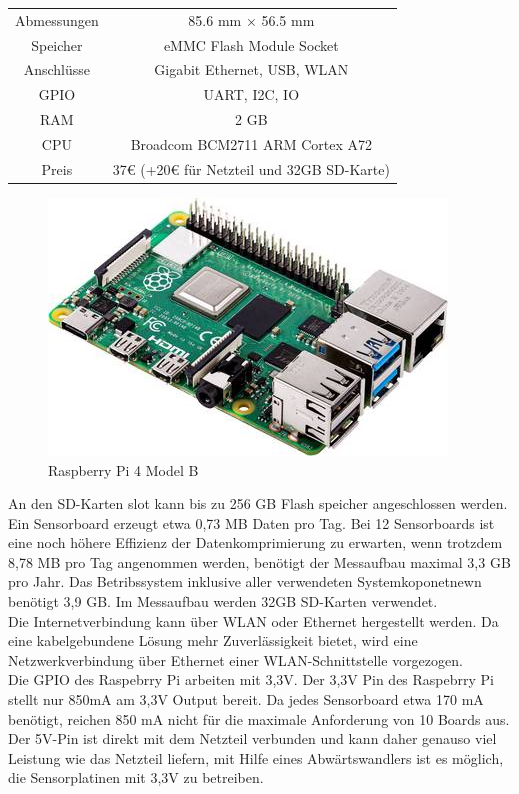 \begin{center}
\begin{tabular}{ c c }
 Abmessungen & 85.6 mm × 56.5 mm \\ 
 Speicher & eMMC Flash Module Socket \\  
 Anschlüsse & Gigabit Ethernet, USB, WLAN \\  
 GPIO & UART, I2C, IO \\  
 RAM & 2 GB \\  
 CPU & Broadcom BCM2711 ARM Cortex A72 \\  
 Preis & 37€ (+20€ für Netzteil und 32GB SD-Karte)  
\end{tabular}
\end{center}
\begin{figure}[H]
  \centering
 \includegraphics[width=0.5\linewidth]{img/Raspberry-Pi-4-Model-B}
	\caption{Raspberry Pi 4 Model B \cite{raspberrypi_fundation}}
  \label{fig:Raspberry_Pi_4_Model_B}
\end{figure}
An den SD-Karten slot kann bis zu 256 GB Flash speicher angeschlossen werden.
Ein Sensorboard erzeugt etwa 0,73 MB Daten pro Tag.
Bei 12 Sensorboards ist eine noch höhere Effizienz der Datenkomprimierung zu erwarten, wenn trotzdem 8,78 MB pro Tag angenommen werden, benötigt der Messaufbau maximal 3,3 GB pro Jahr.
Das Betribssystem inklusive aller verwendeten Systemkoponetnewn benötigt 3,9 GB.
Im Messaufbau werden 32GB SD-Karten verwendet.\\
Die Internetverbindung kann über WLAN oder Ethernet hergestellt werden.
Da eine kabelgebundene Lösung mehr Zuverlässigkeit bietet, wird eine Netzwerkverbindung über Ethernet einer WLAN-Schnittstelle vorgezogen.\\
Die GPIO des Raspebrry Pi arbeiten mit 3,3V.
Der 3,3V Pin des Raspebrry Pi stellt nur 850mA am 3,3V Output bereit.
Da jedes Sensorboard etwa 170 mA benötigt, reichen 850 mA nicht für die maximale Anforderung von 10 Boards aus.
Der 5V-Pin ist direkt mit dem Netzteil verbunden und kann daher genauso viel Leistung wie das Netzteil liefern, mit Hilfe eines Abwärtswandlers ist es möglich, die Sensorplatinen mit 3,3V zu betreiben.\\
